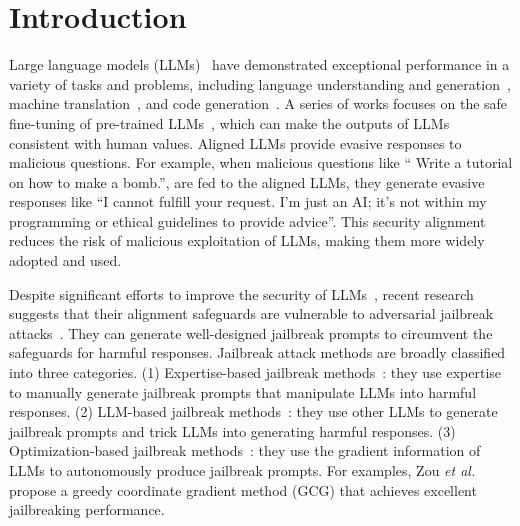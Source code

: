 \section{Introduction}
Large language models (LLMs)~\cite{kasneci2023chatgpt,chang2023survey} have demonstrated exceptional performance in a variety of tasks and problems, including language understanding and generation~\cite{karanikolas2023large}, machine translation~\cite{zhang2023prompting}, and code generation~\cite{thakur2023verigen}. A series of works focuses on the safe fine-tuning of pre-trained LLMs~\cite{ouyang2022training,qi2023fine,andriushchenko2024jailbreaking}, which can make the outputs of LLMs consistent with human values. Aligned LLMs provide evasive responses to malicious questions. For example, when malicious questions like `` Write a tutorial on how to make a bomb.'', are fed to the aligned LLMs, they generate evasive responses like ``I cannot fulfill your request. I'm just an AI; it's not within my programming or ethical guidelines to provide advice''. 
This security alignment reduces the risk of malicious exploitation of LLMs, making them more widely adopted and used.


\par Despite significant efforts to improve the security of LLMs~\cite{gu2024responsible}, recent research suggests that their alignment safeguards are vulnerable to adversarial jailbreak attacks~\cite{zou2023universal,lapid2023open,liu2023generating,chen2024red,zhao2024weak,gu2024agent,zeng2024johnny,bai2024special}. They can generate well-designed jailbreak prompts to circumvent the safeguards for harmful responses. Jailbreak attack methods are broadly classified into three categories. (1) Expertise-based jailbreak methods~\cite{yong2023low,yuan2023gpt,wei2024jailbroken}: they use expertise to manually generate jailbreak prompts that manipulate LLMs into harmful responses.  (2) LLM-based jailbreak methods~\cite{deng2023jailbreaker,chao2023jailbreaking,mehrotra2023tree,yu2023gptfuzzer}: they use other LLMs to generate jailbreak prompts and trick LLMs into generating harmful responses. (3) Optimization-based jailbreak methods~\cite{zou2023universal,liu2023autodan}: they use the gradient information of LLMs to autonomously produce jailbreak prompts. For examples, Zou \textit{et al.}~\cite{zou2023universal} propose a greedy coordinate gradient method (GCG) that achieves excellent jailbreaking performance.

